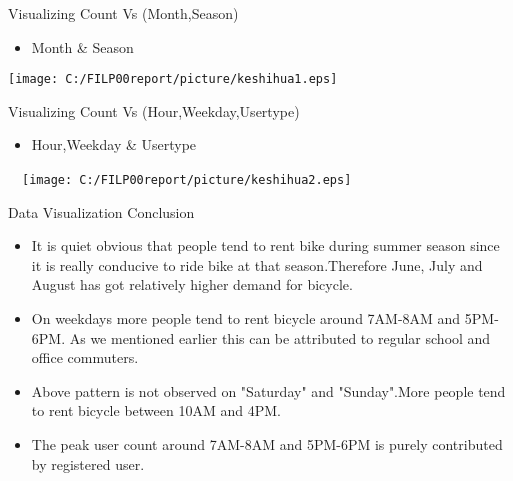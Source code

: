 \documentclass[
 size=14pt,
 paper=smartboard,  %
 mode=present, 		%
 display=slides, 	%
 style=tuliplab,  	%
 pauseslide,
 fleqn,leqno]{powerdot}
\begin{document}

\begin{slide}[toc=,bm=]{Visualizing Count Vs (Month,Season)}
\begin{itemize}
\item
Month \& Season
\end{itemize}
\vspace{-0.8cm}
\begin{center}
\texttt{[image: C:/FILP00report/picture/keshihua1.eps]}
\end{center}
\end{slide}



\begin{slide}[toc=,bm=]{Visualizing Count Vs (Hour,Weekday,Usertype)}
\begin{itemize}
\item
Hour,Weekday \& Usertype
\end{itemize}
\vspace{-0.8cm}
\begin{center}
  \texttt{[image: C:/FILP00report/picture/keshihua2.eps]}
\end{center}
\end{slide}


\begin{slide}{Data Visualization Conclusion}
\begin{itemize}
\item
It is quiet obvious that people tend to rent bike during summer season since it is really conducive to ride bike at that season.Therefore June, July and August has got relatively higher demand for bicycle.
\item
On weekdays more people tend to rent bicycle around 7AM-8AM and 5PM-6PM. As we mentioned earlier this can be attributed to regular school and office commuters.
\item
Above pattern is not observed on "Saturday" and "Sunday".More people tend to rent bicycle between 10AM and 4PM.
\item
The peak user count around 7AM-8AM and 5PM-6PM is purely contributed by registered user.
\end{itemize}

\end{slide}
\end{document}
